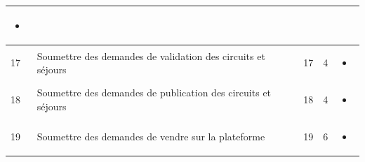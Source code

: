\documentclass[12pt]{report}
\begin{document}
\begin{longtable}{|p{1cm}|p{3cm}|p{2cm}|p{2cm}|p{6cm}|}
\begin{itemize}
							\item
						\end{itemize}
						\\
						\hline
						 17&Soumettre des demandes de validation des circuits et séjours&17&4&
						\begin{itemize}
							\item
						\end{itemize}
						\\
						\hline
						 18&Soumettre des demandes de publication des circuits et séjours&18&4&
						\begin{itemize}
							\item
						\end{itemize}
						\\
						\hline
						 19&Soumettre des demandes de vendre sur la plateforme&19&6&
						\begin{itemize}
							\item
						\end{itemize}
						\\
						\hline
				    \end{longtable}
	
\end{document}
